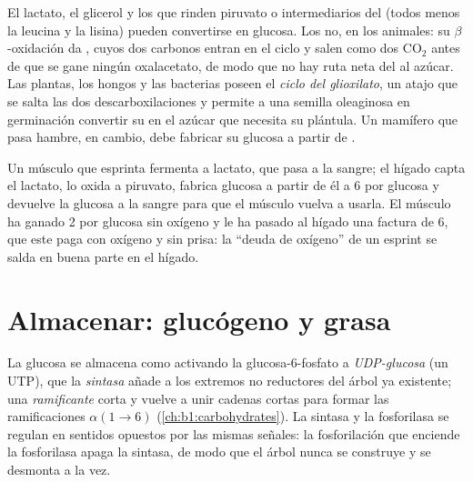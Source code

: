 \begin{proposition}\label{prop:b1:biosyntheses-integration:cannot}
El lactato, el glicerol y los  que rinden piruvato o
intermediarios del  (todos menos la leucina y la lisina)
pueden convertirse en glucosa. Los  no, en los animales: su
$\beta$-oxidación da , cuyos dos carbonos entran en el ciclo y
salen como dos $\mathrm{CO_2}$ antes de que se gane ningún oxalacetato, de
modo que no hay ruta neta del  al azúcar. Las plantas, los hongos
y las bacterias poseen el \emph{ciclo del glioxilato}, un atajo que se salta
las dos descarboxilaciones y permite a una semilla oleaginosa en germinación
convertir su  en el azúcar que necesita su plántula. Un mamífero que
pasa hambre, en cambio, debe fabricar su glucosa a partir de .
\end{proposition}

\begin{example}\label{ex:b1:biosyntheses-integration:cori}
Un músculo que esprinta fermenta  a lactato, que pasa a la sangre;
el hígado capta el lactato, lo oxida a piruvato, fabrica glucosa a partir de
él a 6  por glucosa y devuelve la glucosa a la sangre para que el músculo
vuelva a usarla. El músculo ha ganado 2  por glucosa sin oxígeno y le ha
pasado al hígado una factura de 6, que este paga con oxígeno y sin prisa: la
``deuda de oxígeno'' de un esprint se salda en buena parte en el hígado.
\end{example}

\section{Almacenar: glucógeno y grasa}

\begin{definition}\label{def:b1:biosyntheses-integration:glycogensynthesis}
La glucosa se almacena como  activando la glucosa-6-fosfato a
\emph{UDP-glucosa} (un UTP), que la \emph{ sintasa} añade a los
extremos no reductores del árbol ya existente; una \emph{ ramificante}
corta y vuelve a unir cadenas cortas para formar las ramificaciones
$\alpha(1{\to}6)$ (\cref{ch:b1:carbohydrates}). La sintasa y la fosforilasa
se regulan en sentidos opuestos por las mismas señales: la fosforilación que
enciende la fosforilasa apaga la sintasa, de modo que el árbol nunca se
construye y se desmonta a la vez.
\end{definition}

